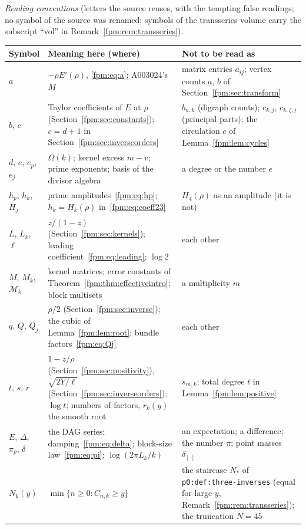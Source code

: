 \documentclass[11pt]{article}
\theoremstyle{definition}\newtheorem{definition}[theorem]{Definition}
\theoremstyle{remark}\newtheorem{remark}[theorem]{Remark}
\newcommand{\file}[1]{\nolinkurl{#1}}
\begin{document}
\medskip\noindent\begin{minipage}{\textwidth}
\emph{Reading conventions} (letters the source reuses, with the tempting
false readings; no symbol of the source was renamed; symbols of the
transseries volume carry the subscript ``vol'' in
Remark~\ref{fpm:rem:transseries}).\par
\smallskip
\begingroup\small\renewcommand{\arraystretch}{1.1}
\noindent\begin{tabular}{@{}>{\raggedright\arraybackslash}p{0.95in}>{\raggedright\arraybackslash}p{3.0in}>{\raggedright\arraybackslash}p{2.15in}@{}}
\toprule
Symbol & Meaning here (where) & Not to be read as\\
\midrule
$a$ & $-\rho E'(\rho)$, \eqref{fpm:eq:a}; A003024's $M$ & matrix entries $a_{ij}$; vertex counts $a$, $b$ of Section~\ref{fpm:sec:transform}\\
$b$, $c$ & Taylor coefficients of $E$ at $\rho$ (Section~\ref{fpm:sec:constants}); $c=d+1$ in Section~\ref{fpm:sec:inverseorders} & $b_{n,k}$ (digraph counts); $c_{k,j}$, $c_{k,\zeta,j}$ (principal parts); the circulation $c$ of Lemma~\ref{fpm:lem:cycles}\\
$d$, $e$, $e_p$, $e_j$ & $\Omega(k)$; kernel excess $m-v$; prime exponents; basis of the divisor algebra & a degree or the number $e$\\
$h_p$, $h_k$, $H_j$ & prime amplitudes~\eqref{fpm:eq:hp}; $h_k=H_k(\rho)$ in~\eqref{fpm:eq:coeff23} & $H_4(\rho)$ as an amplitude (it is not)\\
$L$, $L_k$, $\ell$ & $z/(1-z)$ (Section~\ref{fpm:sec:kernels}); leading coefficient~\eqref{fpm:eq:leading}; $\log2$ & each other\\
$M$, $M_k$, $\mathcal M_k$ & kernel matrices; error constants of Theorem~\ref{fpm:thm:effectiveintro}; block multisets & a multiplicity $m$\\
$q$, $Q$, $Q_j$ & $\rho/2$ (Section~\ref{fpm:sec:inverse}); the cubic of Lemma~\ref{fpm:lem:root}; bundle factors~\eqref{fpm:eq:Qj} & each other\\
$t$, $s$, $r$ & $1-z/\rho$ (Section~\ref{fpm:sec:positivity}), $\sqrt{2Y/\ell}$ (Section~\ref{fpm:sec:inverseorders}); $\log t$; numbers of factors, $r_k(y)$ the smooth root & $s_{m,k}$; total degree $t$ in Lemma~\ref{fpm:lem:positive}\\
$E$, $\Delta$, $\pi_p$, $\delta$ & the DAG series; damping~\eqref{fpm:eq:delta}; block-size law~\eqref{fpm:eq:pi}; $\log(2\pi L_k/k)$ & an expectation; a difference; the number $\pi$; point masses $\delta_{[\cdot]}$\\
$N_k(y)$ & $\min\{n\ge0:C_{n,k}\ge y\}$ & the staircase $N_\ast$ of \file{p0:def:three-inverses} (equal for large $y$, Remark~\ref{fpm:rem:transseries}); the truncation $N=45$\\
\bottomrule
\end{tabular}
\endgroup
\end{minipage}
\end{document}
